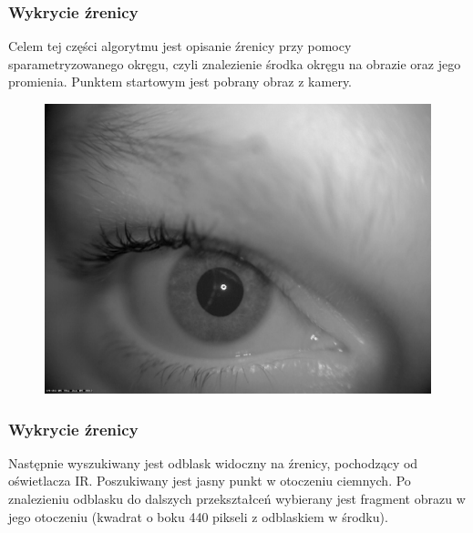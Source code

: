 \documentclass{beamer}
\begin{document}
\begin{frame}
\frametitle{Wykrycie źrenicy}
Celem tej części algorytmu jest opisanie źrenicy przy pomocy sparametryzowanego okręgu, czyli znalezienie środka okręgu na obrazie oraz jego promienia. Punktem startowym jest pobrany obraz z kamery.
\begin{figure}
\begin{center}
\includegraphics[scale=0.13]{szarosc.jpg}
\end{center}
\end{figure}
\end{frame}


\begin{frame}
\frametitle{Wykrycie źrenicy}
Następnie wyszukiwany jest odblask widoczny na źrenicy, pochodzący od oświetlacza IR. Poszukiwany jest jasny punkt w otoczeniu ciemnych. Po znalezieniu odblasku do dalszych przekształceń wybierany jest fragment obrazu w jego otoczeniu (kwadrat o boku 440 pikseli z odblaskiem w środku).
\end{frame}

\end{document}
